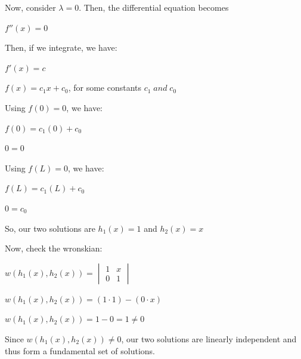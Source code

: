 \documentclass[12pt, executivepaper]{article}
\begin{document}
\begin{flushleft}
Now, consider $\lambda=0$. Then, the differential equation becomes

\pagebreak

\vspace*{-40mm}

\begin{center}

$f''(x)=0$

\end{center}

Then, if we integrate, we have: 

\begin{center}

$f'(x)=c$

$f(x)=c_{1}x+c_{0}$, for some constants $c_{1} \; and \; c_{0}$

\end{center}

Using $f(0)=0$, we have:

\begin{center}

$f(0)=c_{1}(0)+c_{0}$

$0=0$

\end{center}

Using $f(L)=0$, we have: 

\begin{center}

$f(L)=c_{1}(L)+c_{0}$

$0=c_{0}$

\end{center}

So, our two solutions are $h_{1}(x)=1$ and $h_{2}(x)=x$

\vspace{3mm}

Now, check the wronskian:

\begin{center}

$w(h_{1}(x), h_{2}(x))=\begin{vmatrix}
1 & x \\ 
0 & 1 
\end{vmatrix}$

$w(h_{1}(x), h_{2}(x))=(1 \cdot 1)-(0 \cdot x)$

$w(h_{1}(x), h_{2}(x))=1-0=1 \neq 0$

\end{center}

Since $w(h_{1}(x), h_{2}(x)) \neq 0$, our two solutions are linearly independent and thus form a fundamental set of solutions.


\end{flushleft}
\end{document}

